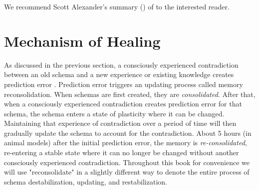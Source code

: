 \documentclass[12pt,letterpaper]{book}
\begin{document}
We recommend Scott Alexander's summary (\textcite{alexanderPrecision}) of \textcite{berghSelfEvidencing} to the interested reader.
\section{Mechanism of Healing}
\label{sec:mechanism}
As discussed in the previous section, a consciously experienced contradiction between an old schema and a new experience or existing knowledge creates prediction error \cite{eckerUnlocking}. Prediction error triggers an updating process called memory reconsolidation. When schemas are first created, they are \textit{consolidated}. After that, when a consciously experienced contradiction creates prediction error for that schema, the schema enters a state of plasticity where it can be changed. Maintaining that experience of contradiction over a period of time will then gradually update the schema to account for the contradiction. About 5 hours (in animal models) after the initial prediction error, the memory is \textit{re-consolidated}, re-entering a stable state where it can no longer be changed without another consciously experienced contradiction. Throughout this book for convenience we will use "reconsolidate" in a slightly different way to denote the entire process of schema destabilization, updating, and restabilization.
\end{document}
